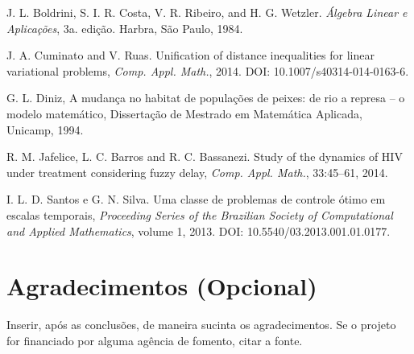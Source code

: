 \documentclass[a0,portrait]{a0poster}
\begin{document}
\begin{multicols}{2}
\begin{thebibliography}{100}
J. L. Boldrini, S. I. R. Costa, V. R. Ribeiro, and H. G. Wetzler. {\it   \'{A}lgebra Linear e Aplica\c{c}\~{o}es}, 3a. edi\c{c}\~{a}o. Harbra, S\~{a}o Paulo, 1984.

J. A. Cuminato and V. Ruas. Unification of distance inequalities for linear variational problems, 
{\it Comp. Appl. Math.}, 2014. DOI: 10.1007/s40314-014-0163-6.

G. L. Diniz, A mudan\c{c}a no habitat de popula\c{c}\~{o}es de peixes: de rio a represa -- o modelo matem\'{a}tico, Disserta\c{c}\~{a}o de Mestrado em Matem\'{a}tica Aplicada, Unicamp, 1994.

 R. M. Jafelice, L. C. Barros and R. C. Bassanezi. Study of the dynamics of HIV under 
treatment considering fuzzy delay, {\it Comp. Appl. Math.}, 33:45--61, 2014.

 I. L. D. Santos e G. N. Silva. Uma classe de problemas de controle \'{o}timo 
em escalas temporais, {\it Proceeding Series of the Brazilian Society of Computational and 
Applied Mathematics}, volume 1, 2013. DOI: 10.5540/03.2013.001.01.0177.
\end{thebibliography}


\section*{Agradecimentos (Opcional)}
\vspace{-1cm}
Inserir, ap\'os as conclus\~oes, de maneira sucinta os agradecimentos. Se o projeto for financiado por alguma ag\^encia de fomento, citar a fonte.




\end{multicols}
\end{document}
